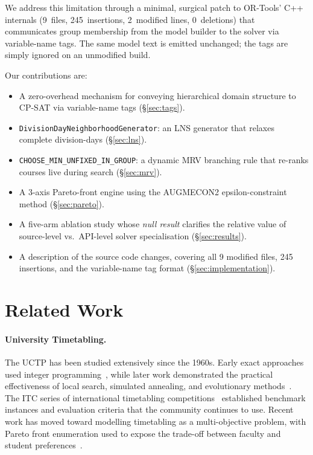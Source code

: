 \documentclass[conference]{IEEEtran}
\begin{document}
We address this limitation through a minimal, surgical patch to OR-Tools'
C++ internals (9~files, 245~insertions, 2~modified lines, 0~deletions) that
communicates group membership from the model builder to the solver via
variable-name tags. The same model text is emitted unchanged; the tags are
simply ignored on an unmodified build.

Our contributions are:
\begin{itemize}
  \item A zero-overhead mechanism for conveying hierarchical domain structure
        to CP-SAT via variable-name tags (\S\ref{sec:tags}).
  \item \texttt{DivisionDayNeighborhoodGenerator}: an LNS generator that
        relaxes complete division-days (\S\ref{sec:lns}).
  \item \texttt{CHOOSE\_MIN\_UNFIXED\_IN\_GROUP}: a dynamic MRV branching rule
        that re-ranks courses live during search (\S\ref{sec:mrv}).
  \item A 3-axis Pareto-front engine using the AUGMECON2
        epsilon-constraint method (\S\ref{sec:pareto}).
  \item A five-arm ablation study whose \emph{null result} clarifies the
        relative value of source-level vs.\ API-level solver specialisation
        (\S\ref{sec:results}).
  \item A description of the source code changes, covering all 9 modified
        files, 245 insertions, and the variable-name tag format
        (\S\ref{sec:implementation}).
\end{itemize}

\section{Related Work}\label{sec:related}

\paragraph{University Timetabling.}
The UCTP has been studied extensively since the 1960s. Early exact approaches
used integer programming~\cite{Schaerf1999}, while later work demonstrated the
practical effectiveness of local search, simulated annealing, and evolutionary
methods~\cite{Burke2002}. The ITC series of international timetabling
competitions~\cite{ITC2007,ITC2019} established benchmark instances and
evaluation criteria that the community continues to use. Recent work has
moved toward modelling timetabling as a multi-objective problem, with Pareto
front enumeration used to expose the trade-off between faculty and student
preferences~\cite{Pillay2018}.
\end{document}
